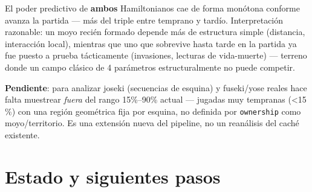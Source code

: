 \documentclass[11pt, a4paper]{article}
\begin{document}
\begin{tcolorbox}[quotebox]
  El poder predictivo de \textbf{ambos} Hamiltonianos cae de forma
  mon\'otona conforme avanza la partida --- m\'as del triple entre
  temprano y tard\'io. Interpretaci\'on razonable: un moyo reci\'en
  formado depende m\'as de estructura simple (distancia, interacci\'on
  local), mientras que uno que sobrevive hasta tarde en la partida ya
  fue puesto a prueba t\'acticamente (invasiones, lecturas de vida-muerte)
  --- terreno donde un campo cl\'asico de 4 par\'ametros
  estructuralmente no puede competir.
\end{tcolorbox}

\begin{tcolorbox}[pendingbox]
  \textbf{Pendiente}: para analizar joseki (secuencias de esquina) y
  fuseki/yose reales hace falta muestrear \emph{fuera} del rango
  15\%--90\% actual --- jugadas muy tempranas (<15\,\%) con una regi\'on
  geom\'etrica fija por esquina, no definida por \texttt{ownership}
  como moyo/territorio. Es una extensi\'on nueva del pipeline, no un
  reanálisis del cach\'e existente.
\end{tcolorbox}

\section{Estado y siguientes pasos}
\end{document}
